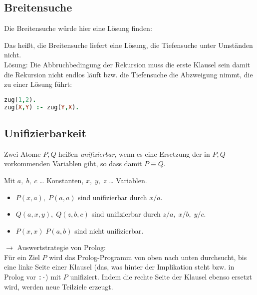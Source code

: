 \subsection{Breitensuche}
Die Breitensuche würde hier eine Lösung finden:
\begin{center}
\end{center}
Das heißt, die Breitensuche liefert eine Lösung, die Tiefensuche unter Umständen nicht.\bigskip\\
Lösung: Die Abbruchbedingung der Rekursion muss die erste Klausel sein damit die Rekursion nicht endlos läuft bzw. die Tiefensuche die Abzweigung nimmt, die zu einer Lösung führt:
\begin{lstlisting}[language=Prolog]
zug(1,2).
zug(X,Y) :- zug(Y,X).
\end{lstlisting}

\subsection{Unifizierbarkeit}
 Zwei Atome $P,Q$ heißen \emph{unifizierbar}, wenn es eine Ersetzung der in $P,Q$ vorkommenden Variablen gibt, so dass damit $P\equiv Q$.

 Mit $a,\; b,\; c$ … Konstanten, $x,\; y ,\; z$ … Variablen.
\begin{itemize}
\item $P(x,a),\; P(a,a)$ sind unifizierbar durch $x/a$.
\item $Q(a,x,y),\; Q(z,b,c)$ sind unifizierbar durch $z/a,\; x/b,\; y/c$.
\item $P(x,x)\; P(a,b)$ sind nicht unifizierbar.
\end{itemize}

$\to$ Auswertstrategie von Prolog:\\
Für ein Ziel $P$ wird das Prolog-Programm von oben nach unten durchsucht, bis eine linke Seite einer Klausel (das, was hinter der Implikation steht bzw. in Prolog vor \lstinline$:-$) mit $P$ unifiziert. Indem die rechte Seite der Klausel ebenso ersetzt wird, werden neue Teilziele erzeugt.

